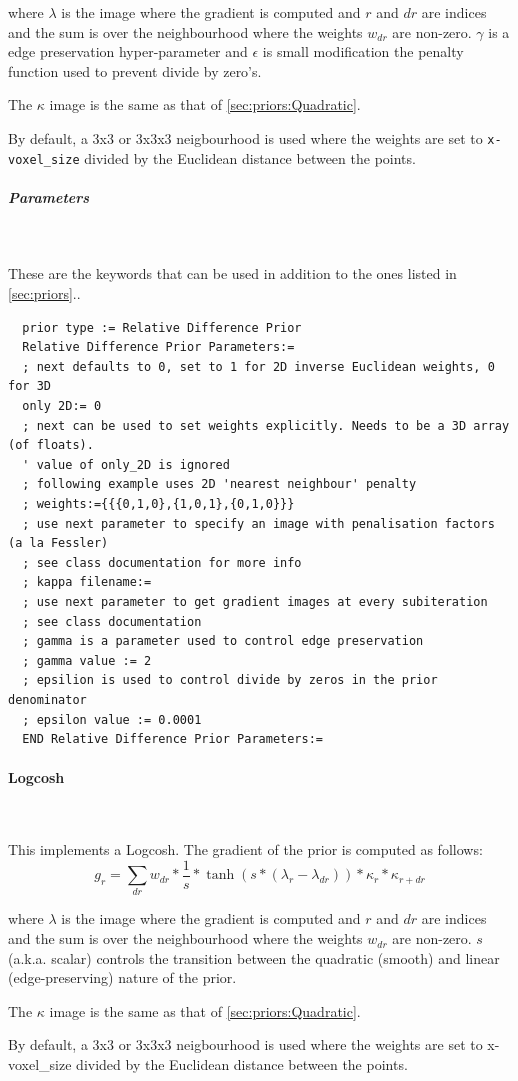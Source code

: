 \documentclass{article}
\newcommand{\subsubsubsection}[1]{\paragraph{#1}\mbox{} \\}
\newcommand{\subsubsubsubsection}[1]{\subparagraph{#1} \mbox{} \\}
\begin{document}
{{  \noindent where $\lambda$ is the image where the gradient is computed
   and $r$ and $dr$ are indices and the sum
  is over the neighbourhood where the weights $w_{dr}$ are non-zero.
  $\gamma$ is a edge preservation hyper-parameter and $\epsilon$ is small 
  modification the penalty function used to prevent divide by zero's.

  The $\kappa$ image is the same as that of \ref{sec:priors:Quadratic}.

  By default, a 3x3 or 3x3x3 neigbourhood is used where the weights are set to 
  \texttt{x-voxel\_size} divided by the Euclidean distance between the points.
 
{ \subsubsubsubsection{Parameters}
}
  These are the keywords that can be used in addition to the ones listed in \ref{sec:priors}..
  \begin{verbatim}
  prior type := Relative Difference Prior
  Relative Difference Prior Parameters:=
  ; next defaults to 0, set to 1 for 2D inverse Euclidean weights, 0 for 3D 
  only 2D:= 0
  ; next can be used to set weights explicitly. Needs to be a 3D array (of floats).
  ' value of only_2D is ignored
  ; following example uses 2D 'nearest neighbour' penalty
  ; weights:={{{0,1,0},{1,0,1},{0,1,0}}}
  ; use next parameter to specify an image with penalisation factors (a la Fessler)
  ; see class documentation for more info
  ; kappa filename:=
  ; use next parameter to get gradient images at every subiteration
  ; see class documentation
  ; gamma is a parameter used to control edge preservation
  ; gamma value := 2
  ; epsilion is used to control divide by zeros in the prior denominator
  ; epsilon value := 0.0001
  END Relative Difference Prior Parameters:=
  \end{verbatim}


{ \subsubsubsection{Logcosh} \label{sec:priors:Logcosh}
}
This implements a Logcosh. The gradient of the prior is computed as follows:
  \[g_r = \sum_{dr} w_{dr} * \frac{1}{s} * \tanh(s*(\lambda_{r} - \lambda_{dr})) *
  \kappa_r * \kappa_{r+dr}\]

  \noindent where $\lambda$ is the image where the gradient is computed
   and $r$ and $dr$ are indices and the sum
  is over the neighbourhood where the weights $w_{dr}$ are non-zero.
  $s$ (a.k.a. scalar) controls the transition between the quadratic (smooth) and linear (edge-preserving) nature of the prior.

  The $\kappa$ image is the same as that of \ref{sec:priors:Quadratic}.

  By default, a 3x3 or 3x3x3 neigbourhood is used where the weights are set to 
  x-voxel\_size divided by the Euclidean distance between the points.
 
}}
\end{document}
